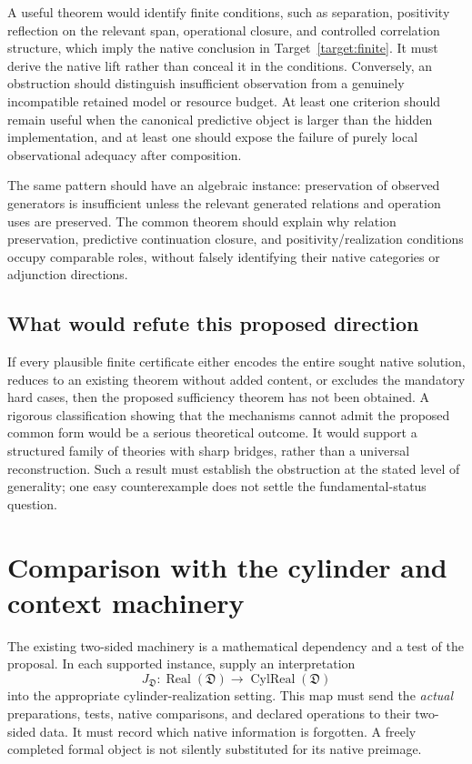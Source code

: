 \documentclass[11pt]{article}
\theoremstyle{remark}
\newcommand{\Real}{\operatorname{Real}}
\begin{document}
A useful theorem would identify finite conditions, such as separation, positivity reflection on the relevant span, operational closure, and controlled correlation structure, which imply the native conclusion in Target~\ref{target:finite}. It must derive the native lift rather than conceal it in the conditions. Conversely, an obstruction should distinguish insufficient observation from a genuinely incompatible retained model or resource budget. At least one criterion should remain useful when the canonical predictive object is larger than the hidden implementation, and at least one should expose the failure of purely local observational adequacy after composition.

The same pattern should have an algebraic instance: preservation of observed generators is insufficient unless the relevant generated relations and operation uses are preserved. The common theorem should explain why relation preservation, predictive continuation closure, and positivity/realization conditions occupy comparable roles, without falsely identifying their native categories or adjunction directions.

\subsection{What would refute this proposed direction}

If every plausible finite certificate either encodes the entire sought native solution, reduces to an existing theorem without added content, or excludes the mandatory hard cases, then the proposed sufficiency theorem has not been obtained. A rigorous classification showing that the mechanisms cannot admit the proposed common form would be a serious theoretical outcome. It would support a structured family of theories with sharp bridges, rather than a universal reconstruction. Such a result must establish the obstruction at the stated level of generality; one easy counterexample does not settle the fundamental-status question.

\section{Comparison with the cylinder and context machinery}
\label{sec:cylinders}

The existing two-sided machinery is a mathematical dependency and a test of the proposal. In each supported instance, supply an interpretation
\[
 J_{\mathfrak D}:\Real(\mathfrak D)\longrightarrow\operatorname{CylReal}(\mathfrak D)
\]
into the appropriate cylinder-realization setting. This map must send the \emph{actual} preparations, tests, native comparisons, and declared operations to their two-sided data. It must record which native information is forgotten. A freely completed formal object is not silently substituted for its native preimage.
\end{document}
